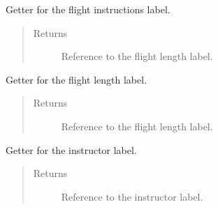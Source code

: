 \documentclass[letterpaper,10pt,english]{sphinxmanual}
\begin{document}
\begin{fulllineitems}
\begin{fulllineitems}
\begin{quote}
\begin{description}
\end{description}\end{quote}

\end{fulllineitems}


\begin{fulllineitems}
\label{\detokenize{index:src.Views.View_ReportScreen.ReportWindow.del_LblFlightInstructions}}
Getter for the flight instructions label.
\begin{quote}\begin{description}
\item[{Returns}] \leavevmode
Reference to the flight length label.

\end{description}\end{quote}

\end{fulllineitems}


\begin{fulllineitems}
\label{\detokenize{index:src.Views.View_ReportScreen.ReportWindow.del_LblFlightLength}}
Getter for the flight length label.
\begin{quote}\begin{description}
\item[{Returns}] \leavevmode
Reference to the flight length label.

\end{description}\end{quote}

\end{fulllineitems}


\begin{fulllineitems}
\label{\detokenize{index:src.Views.View_ReportScreen.ReportWindow.del_LblInstructor}}
Getter for the instructor label.
\begin{quote}\begin{description}
\item[{Returns}] \leavevmode
Reference to the instructor label.


\end{description}
\end{quote}
\end{fulllineitems}
\end{fulllineitems}
\end{document}

